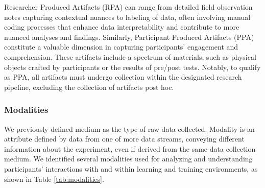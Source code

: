 \documentclass[manuscript,screen,review]{acmart}
\begin{document}
Researcher Produced Artifacts (RPA) can range from detailed field observation notes capturing contextual nuances to labeling of data, often involving manual coding processes that enhance data interpretability and contribute to more nuanced analyses and findings. Similarly, Participant Produced Artifacts (PPA) constitute a valuable dimension in capturing participants' engagement and comprehension. These artifacts include a spectrum of materials, such as physical objects crafted by participants or the results of pre/post tests. Notably, to qualify as PPA, all artifacts must undergo collection within the designated research pipeline, excluding the collection of artifacts post hoc. 

\subsubsection{Modalities} \label{sec:modalities}

We previously defined medium as the type of raw data collected. Modality is an attribute defined by data from one of more data streams, conveying different information about the experiment, even if derived from the same data collection medium. We identified several modalities used for analyzing and understanding participants' interactions with and within learning and training environments, as shown in Table \ref{tab:modalities}. 
\end{document}
